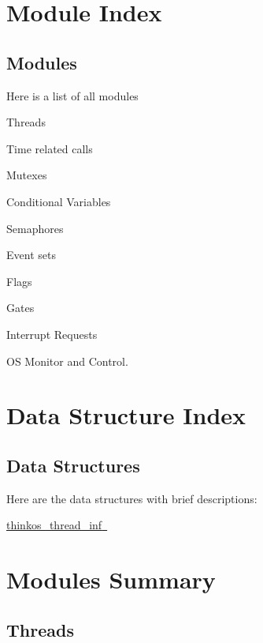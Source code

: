 
\section{\texorpdfstring{{Module
Index}}{Module Index}}\label{module-index}

\subsection{\texorpdfstring{{Modules}}{Modules}}\label{modules}

{Here is a list of all modules}

{Threads~~~~~~~~}

{Time related calls~~~~~~~~}

{Mutexes~~~~~~~~}

{Conditional Variables~~~~~~~~}

{Semaphores~~~~~~~~}

{Event sets~~~~~~~~}

{Flags~~~~~~~~}

{Gates~~~~~~~~}

{Interrupt Requests~~~~~~~~}

{OS Monitor and Control.~~~~~~~~}

{}

\section{\texorpdfstring{{Data Structure
Index}}{Data Structure Index}}\label{data-structure-index}

\subsection{\texorpdfstring{{Data
Structures}}{Data Structures}}\label{data-structures}

{Here are the data structures with brief descriptions:}

{\protect\hyperlink{h.2iq8gzs}{thinkos\_thread\_inf}}{\protect\hyperlink{h.2iq8gzs}{~}}{~~~~~~~~~}

\section{\texorpdfstring{{Modules
Summary}}{Modules Summary}}\label{modules-summary}

\subsection{\texorpdfstring{{Threads}}{Threads}}\label{threads}

